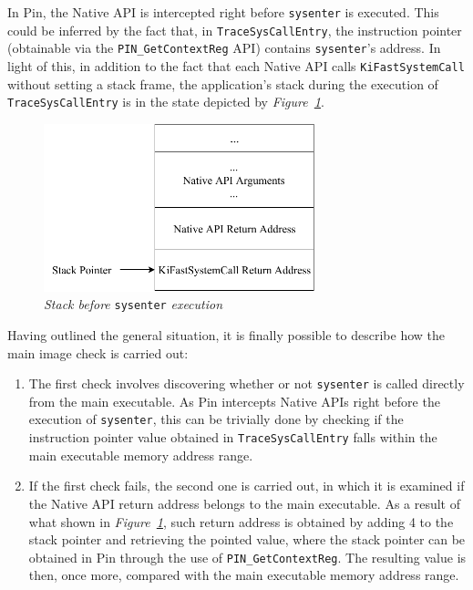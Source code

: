 In Pin, the Native API is intercepted right before \texttt{sysenter} is executed. This could be inferred by the fact that, in \texttt{TraceSysCallEntry}, the instruction pointer (obtainable via the \texttt{PIN\_GetContextReg} API) contains \texttt{sysenter}'s address. In light of this, in addition to the fact that each Native API calls \texttt{KiFastSystemCall} without setting a stack frame, the application's stack during the execution of \texttt{TraceSysCallEntry} is in the state depicted by \textit{Figure~\ref{sysenter}}.
\\
\begin{figure}[h]
\centering
\includegraphics[width=0.7\textwidth]{Figures/StackMainImage.pdf}
\caption{\textit{Stack before} \texttt{sysenter} \textit{execution}}
\label{sysenter}
\end{figure}     
Having outlined the general situation, it is finally possible to describe how the main image check is carried out:

\begin{enumerate}
\item The first check involves discovering whether or not \texttt{sysenter} is called directly from the main executable. As Pin intercepts Native APIs right before the execution of \texttt{sysenter}, this can be trivially done by checking if the instruction pointer value obtained in \texttt{TraceSysCallEntry} falls within the main executable memory address range.
\item If the first check fails, the second one is carried out, in which it is examined if the Native API return address belongs to the main executable. As a result of what shown in \textit{Figure~\ref{sysenter}}, such return address is obtained by adding 4 to the stack pointer and retrieving the pointed value, where the stack pointer can be obtained in Pin through the use of \texttt{PIN\_GetContextReg}. The resulting value is then, once more, compared with the main executable memory address range.
\end{enumerate}

